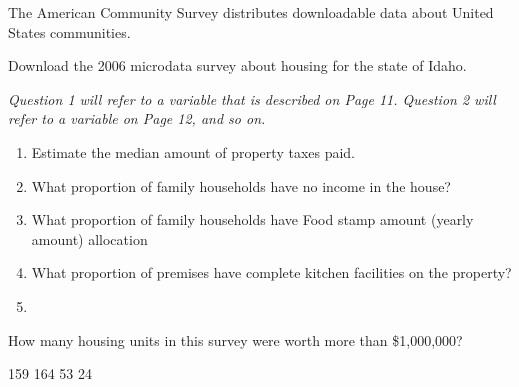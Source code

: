 \documentclass{article}
\begin{document}
\newpage



The American Community Survey distributes downloadable data about United States communities. 

Download the 2006 microdata survey about housing for the state of Idaho.


\textit{Question 1 will refer to a variable that is described on Page 11. Question 2 will refer to a variable on Page 12, and so on.}

\begin{enumerate}
	\item Estimate the median amount of property taxes paid.
	\item What proportion of family households have no income in the house?
	\item What proportion of family households have Food stamp amount (yearly amount) allocation
	\item What proportion of premises have complete kitchen facilities on the property?
	\item 
\end{enumerate}


How many housing units in this survey were worth more than \$1,000,000?

159
164
53
24



\end{document}
